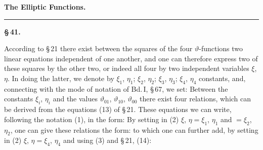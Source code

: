 
\begin{center}

\vspace{1em}
{\Large\bfseries The Elliptic Functions.}

\vspace{0.5em}
\rule{0.3\textwidth}{0.4pt}
\end{center}

\begin{center}
\textbf{\S\,41. }
\end{center}

According to \S\,21 there exist between the squares of the four
\(\vartheta\)-functions two linear equations independent of one another, and
one can therefore express two of these squares by the other two, or indeed
all four by two independent variables \(\xi\), \(\eta\). In doing the latter,
we denote by \(\xi_1\), \(\eta_1\); \(\xi_2\), \(\eta_2\); \(\xi_3\), \(\eta_3\); \(\xi_4\), \(\eta_4\)
constants, and, connecting with the mode of notation of Bd.\,I, \S\,67, we
set:
Between the constants \(\xi_i\), \(\eta_i\) and the values \(\vartheta_{01}\), \(\vartheta_{10}\),
\(\vartheta_{00}\) there exist four relations, which can be derived from the
equations (13) of \S\,21. These equations we can write, following the
notation (1), in the form:
By setting in (2) \(\xi\), \(\eta = \xi_1\), \(\eta_1\)
and \(= \xi_2\), \(\eta_2\), one can give these relations the form:
to which one can further add, by setting in (2) \(\xi\), \(\eta = \xi_4\), \(\eta_4\)
and using (3) and \S\,21, (14):
